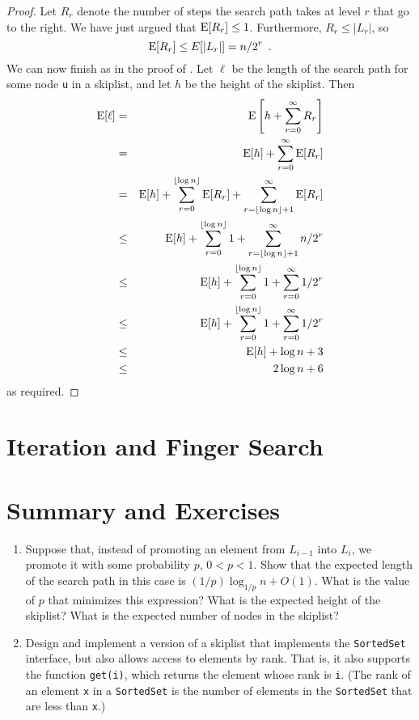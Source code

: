 \begin{proof}
  Let $R_r$ denote the number of steps the search path takes at level
  $r$ that go to the right.   We have just argued that $\mathrm{E}[R_r]\le 1$.
  Furthermore, $R_r\le |L_r|$, so
  \[
    \mathrm{E}[R_r] \le E[|L_r|] = n/2^r \enspace .
  \]
  We can now finish as in the proof of .
  Let $\ell$ be  the length of the search path for some node \mbox{\texttt{{\color{var}u}}} in a
  skiplist, and let $h$ be the height of the skiplist.  Then
  \begin{eqnarray*}
      \mathrm{E}[\ell] 
         &=& \mathrm{E}\left[ h + \sum_{r=0}^\infty R_r \right] \\
         &=& \mathrm{E}[h] + \sum_{r=0}^\infty \mathrm{E}[R_r]  \\
         &=& \mathrm{E}[h] + \sum_{r=0}^{\lfloor\log n\rfloor} \mathrm{E}[R_r] 
              + \sum_{r=\lfloor\log n\rfloor+1}^\infty \mathrm{E}[R_r] \\
         &\le& \mathrm{E}[h] + \sum_{r=0}^{\lfloor\log n\rfloor} 1
              + \sum_{r=\lfloor\log n\rfloor+1}^\infty n/2^r \\
         &\le& \mathrm{E}[h] + \sum_{r=0}^{\lfloor\log n\rfloor} 1
              + \sum_{r=0}^{\infty} 1/2^r \\
         &\le& \mathrm{E}[h] + \sum_{r=0}^{\lfloor\log n\rfloor} 1
              + \sum_{r=0}^{\infty} 1/2^r \\
         &\le& \mathrm{E}[h] + \log n + 3 \\
         &\le& 2\log n + 6
  \end{eqnarray*}
  as required.
\end{proof}


\section{Iteration and Finger Search}


\section{Summary and Exercises}

\begin{enumerate}
\item Suppose that, instead of promoting an element from $L_{i-1}$ into
$L_i$, we promote it with some probability $p$, $0 < p < 1$.  Show that
the expected length of the search path in this case is $(1/p)\log_{1/p}
n + O(1)$.  What is the value of $p$ that minimizes this expression? What
is the expected height of the skiplist? What is the expected number of
nodes in the skiplist?

\item Design and implement a version of a skiplist that implements the
\mbox{\texttt{SortedSet}} interface, but also allows access to elements by rank.
That is, it also supports the function \mbox{\texttt{get({\color{var}i})}}, which returns the element
whose rank is \mbox{\texttt{{\color{var}i}}}. (The rank of an element \mbox{\texttt{{\color{var}x}}} in a \mbox{\texttt{SortedSet}} is the number of elements in the \mbox{\texttt{SortedSet}} that are less than \mbox{\texttt{{\color{var}x}}}.)
\end{enumerate}

